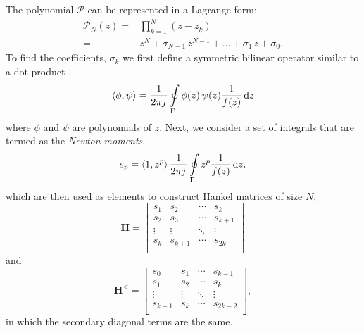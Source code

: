 \documentclass[12pt]{article}
\begin{document}
The polynomial $\mathcal P$ can be represented in a Lagrange form:
%
\begin{equation}
  \begin{split}
    \mathcal{P}_N(z) ={}& \prod \limits_{k = 1}^N \left(z - z_k \right) \\
    ={}& z^N + \sigma_{N-1} \, z^{N-1} + \dots + \sigma_{1} \, z + \sigma_0.
  \end{split}
  \label{eq:poly}%
\end{equation}
%
To find the coefficients, $\sigma_k$ we first define a symmetric bilinear operator similar to a dot product \cite{Kravanja1999,Gillan2006c},
%
\begin{equation}
  \left \langle \phi, \psi \right \rangle = \frac{1}{2 \pi j\mkern1mu} \oint \limits_{\Gamma} \phi(z) \, \psi(z) \frac{1}{f(z)} \mathop{}\!\mathrm{d}{z}
  \label{eq:blinear}
\end{equation}
%
where $\phi$ and $\psi$ are polynomials of $z$. Next, we consider a set of integrals that are termed as the \emph{Newton moments},
%
\begin{equation}
  s_p = \left \langle 1, z^p \right \rangle \frac{1}{2 \pi j\mkern1mu} \oint \limits_{\Gamma} z^p \frac{1}{f(z)} \mathop{}\!\mathrm{d}{z}.
  \label{eq:s_p}
\end{equation}
%
which are then used as elements to construct Hankel matrices of size $N$,
%
\begin{equation}
  \mathbf H =
  \begin{bmatrix}
    s_1 & s_2 & \cdots & s_k \\
    s_2 & s_3 & \cdots & s_{k+1} \\
    \vdots & \vdots & \ddots & \vdots \\
    s_k & s_{k+1} & \cdots & s_{2k} \\
  \end{bmatrix}
  \label{eq:Hmat}
\end{equation}
%
and
%
\begin{equation}
  \mathbf H^< =
  \begin{bmatrix}
    s_0 & s_1 & \cdots & s_{k-1} \\
    s_1 & s_2 & \cdots & s_{k} \\
    \vdots & \vdots & \ddots & \vdots \\
    s_{k-1} & s_{k} & \cdots & s_{2k-2} \\
  \end{bmatrix},
  \label{eq:Hmat<}
\end{equation}
%
in which the secondary diagonal terms are the same.
\end{document}
